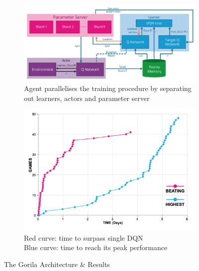 \begin{figure}[H]
	\centering
	\begin{subfigure}[b]{0.4\textwidth}
		\centering
		\includegraphics[width=\textwidth]{figures/algos/gorila.png}
		\caption{Agent parallelises the training procedure by separating out learners, actors and parameter server}
		\label{fig:gorila_arch}
    \end{subfigure}
    \hfill
	\begin{subfigure}[b]{0.4\textwidth}
		\centering
		\includegraphics[width=\textwidth]{figures/algos/gorila_results.png}
        \caption{Red curve: time to surpass single DQN\\
                Blue curve: time to reach its peak performance}
		\label{fig:gorila_results}
	\end{subfigure}
	\hfill
	   \caption{The Gorila Architecture \& Results}
	   \label{fig:gorila}
\end{figure}

